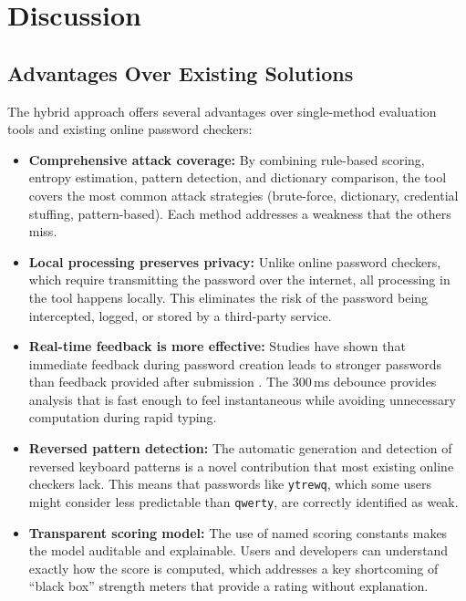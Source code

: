 \clearpage

\section{Discussion}

\subsection{Advantages Over Existing Solutions}

The hybrid approach offers several advantages over single-method evaluation tools and existing online password checkers:

\begin{itemize}
    \item \textbf{Comprehensive attack coverage:} By combining rule-based scoring, entropy estimation, pattern detection, and dictionary comparison, the tool covers the most common attack strategies (brute-force, dictionary, credential stuffing, pattern-based). Each method addresses a weakness that the others miss.

    \item \textbf{Local processing preserves privacy:} Unlike online password checkers, which require transmitting the password over the internet, all processing in the tool happens locally. This eliminates the risk of the password being intercepted, logged, or stored by a third-party service.

    \item \textbf{Real-time feedback is more effective:} Studies have shown that immediate feedback during password creation leads to stronger passwords than feedback provided after submission \cite{proctor2002}. The 300\,ms debounce provides analysis that is fast enough to feel instantaneous while avoiding unnecessary computation during rapid typing.

    \item \textbf{Reversed pattern detection:} The automatic generation and detection of reversed keyboard patterns is a novel contribution that most existing online checkers lack. This means that passwords like \texttt{ytrewq}, which some users might consider less predictable than \texttt{qwerty}, are correctly identified as weak.

    \item \textbf{Transparent scoring model:} The use of named scoring constants makes the model auditable and explainable. Users and developers can understand exactly how the score is computed, which addresses a key shortcoming of ``black box'' strength meters that provide a rating without explanation.


\end{itemize}
